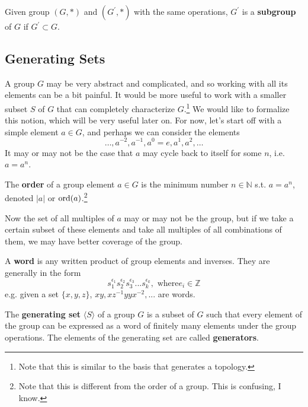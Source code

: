   \begin{definition}[Subgroup]
    Given group $(G, \ast)$ and $(G^\prime, \ast)$ with the same operations, $G^\prime$ is a \textbf{subgroup} of $G$ if $G^\prime \subset G$. 
  \end{definition} 

\subsection{Generating Sets} 

  A group $G$ may be very abstract and complicated, and so working with all its elements can be a bit painful. It would be more useful to work with a smaller subset $S$ of $G$ that can completely characterize $G$.\footnote{Note that this is similar to the basis that generates a topology.} We would like to formalize this notion, which will be very useful later on. For now, let's start off with a simple element $a \in G$, and perhaps we can consider the elements 
  \begin{equation}
    \ldots, a^{-2}, a^{-1}, a^0 = e, a^1, a^2, \ldots
  \end{equation}
  It may or may not be the case that $a$ may cycle back to itself for some $n$, i.e. $a = a^n$. 

  \begin{definition}
    The \textbf{order} of a group element $a \in G$ is the minimum number $n \in \mathbb{N}$ s.t. $a = a^n$, denoted $|a|$ or $\ord(a)$.\footnote{Note that this is different from the order of a group. This is confusing, I know. }
  \end{definition} 

  Now the set of all multiples of $a$ may or may not be the group, but if we take a certain subset of these elements and take all multiples of all combinations of them, we may have better coverage of the group. 

  \begin{definition}[Word]
    A \textbf{word} is any written product of group elements and inverses. They are generally in the form
    \begin{equation}
      s_{1}^{\epsilon_{1}} s_{2}^{\epsilon_{2}} s_{3}^{\epsilon_{3}}... s_{k}^{\epsilon_{k}}, \text{ where} e_i \in \mathbb{Z}
    \end{equation} 
    e.g. given a set $\{x,y,z\}$, $x y, x z^{-1} y y x^{-2},...$ are words. 
  \end{definition}

  \begin{definition}
    The \textbf{generating set} $\langle S \rangle$ of a group $G$ is a subset of $G$ such that every element of the group can be expressed as a word of finitely many elements under the group operations. The elements of the generating set are called \textbf{generators}.
  \end{definition}

